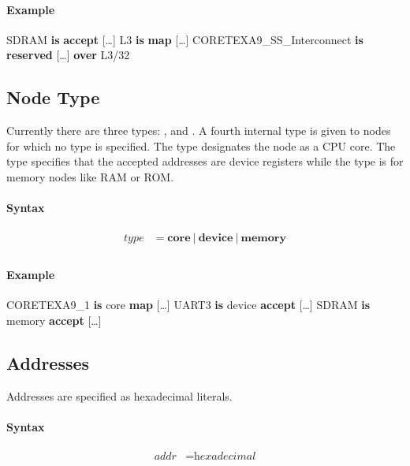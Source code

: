 \documentclass[a4paper,11pt,twoside]{report}
\begin{document}
{{{\paragraph{Example}
\begin{syntax}
    SDRAM \textbf{is} \textbf{accept} [\ldots]
    L3 \textbf{is} \textbf{map} [\ldots]
    CORETEXA9_SS_Interconnect \textbf{is} \textbf{reserved} [\ldots] \textbf{over} L3/32
\end{syntax}

\subsection{Node Type}
Currently there are three types: ,  and . A fourth internal type  is given to nodes for which no type is specified.
The  type designates the node as a CPU core. The  type specifies that the accepted addresses are device registers while the  type is for memory nodes like RAM or ROM.

\paragraph{Syntax}
\begin{align*}
\textit{type} & \mathop{=}
    \textbf{core}\
    |\
    \textbf{device}\
    |\
    \textbf{memory} \\
\end{align*}

\paragraph{Example}
\begin{syntax}
    CORETEXA9_1 \textbf{is} core \textbf{map} [\ldots]
    UART3 \textbf{is} device \textbf{accept} [\ldots]
    SDRAM \textbf{is} memory \textbf{accept} [\ldots]
\end{syntax}

\subsection{Addresses}
Addresses are specified as hexadecimal literals.

\paragraph{Syntax}
\begin{align*}
\textit{addr} & \mathop{=} \textit{hexadecimal} \\
\end{align*}

}}}
\end{document}
